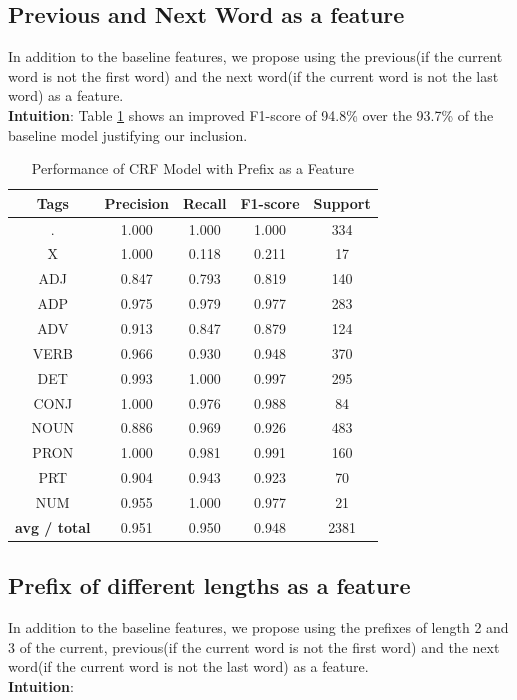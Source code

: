 \documentclass[12pt]{article}
\begin{document}
\subsection{Previous and Next Word as a feature}
In addition to the baseline features, we propose using the  previous(if the current word is not the first word) and the next word(if the current word is not the last word) as a feature.\\
\textbf{Intuition}:
Table \ref{tab:table3} shows an improved F1-score of 94.8\% over the 93.7\% of the baseline model justifying our inclusion.
\begin{table}[h!]
\begin{center}
    \caption{Performance of CRF Model with Prefix as a Feature}
    \label{tab:table3}
\begin{tabular}{ c c c c c}
 \textbf{Tags}& \textbf{Precision} & \textbf{Recall} & \textbf{F1-score} & \textbf{Support} \\ 
 \hline

          .   &   1.000  &   1.000 &    1.000    &   334\\
          X   &   1.000  &   0.118 &    0.211    &    17\\
        ADJ   &   0.847 &    0.793 &    0.819    &   140\\
        ADP   &   0.975 &    0.979 &    0.977    &   283\\
        ADV   &   0.913 &    0.847 &    0.879    &   124\\
       VERB  &    0.966 &    0.930 &    0.948    &   370\\
        DET  &    0.993  &   1.000 &    0.997   &    295\\
       CONJ  &    1.000   &  0.976  &   0.988   &     84\\
       NOUN  &    0.886  &   0.969 &    0.926   &    483\\
       PRON   &   1.000 &    0.981 &    0.991   &    160\\
        PRT   &   0.904 &    0.943 &    0.923   &     70\\
        NUM   &   0.955  &   1.000 &    0.977   &     21\\
\hline
\textbf{avg / total}&      0.951 &    0.950  &   0.948  &    2381
 
 \end{tabular}
\end{center}
\end{table}


\subsection{Prefix of different lengths as a feature}
In addition to the baseline features, we propose using the prefixes of length 2 and 3 of the current, previous(if the current word is not the first word) and the next word(if the current word is not the last word) as a feature.\\
\textbf{Intuition}:
\end{document}
